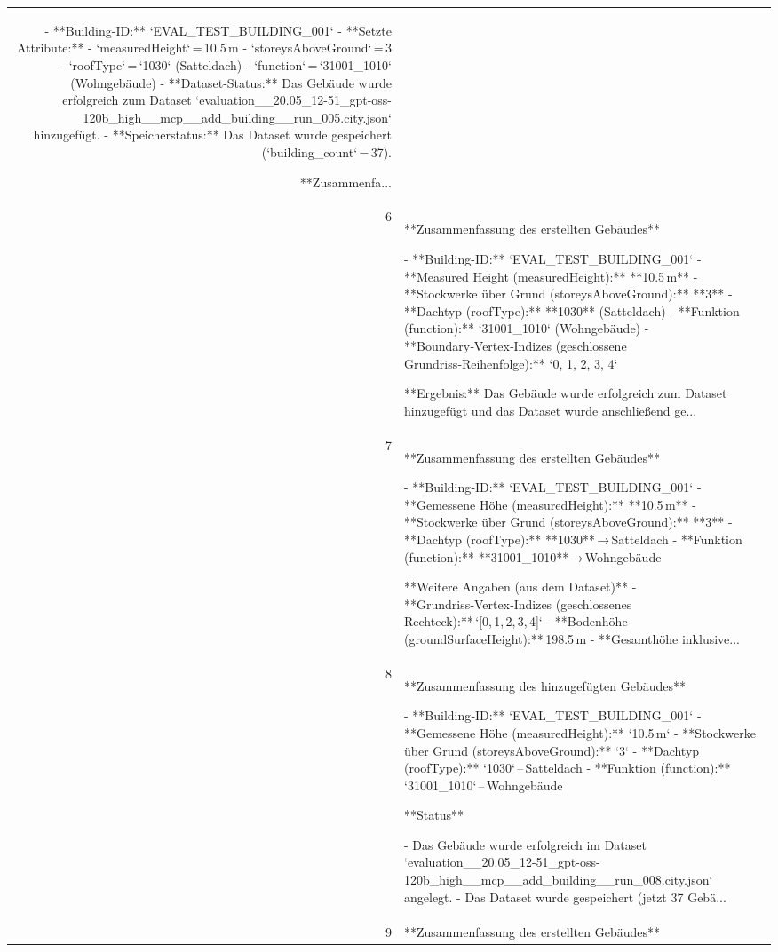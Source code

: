 \documentclass[a4paper,11pt]{article}
\begin{document}
\begin{table}[ht]
\begin{tabular}{r p{12cm}}
- **Building-ID:** `EVAL\_TEST\_BUILDING\_001`  
- **Setzte Attribute:**  
  - `measuredHeight` = 10.5 m  
  - `storeysAboveGround` = 3  
  - `roofType` = `1030` (Satteldach)  
  - `function` = `31001\_1010` (Wohngebäude)  
- **Dataset‑Status:** Das Gebäude wurde erfolgreich zum Dataset `evaluation\_\_20.05\_12-51\_gpt-oss-120b\_high\_\_mcp\_\_add\_building\_\_run\_005.city.json` hinzugefügt.  
- **Speicherstatus:** Das Dataset wurde gespeichert (`building\_count` = 37).  

**Zusammenfa... \\
6 & **Zusammenfassung des erstellten Gebäudes**

- **Building-ID:** `EVAL\_TEST\_BUILDING\_001`  
- **Measured Height (measuredHeight):** **10.5 m**  
- **Stockwerke über Grund (storeysAboveGround):** **3**  
- **Dachtyp (roofType):** **1030** (Satteldach)  
- **Funktion (function):** `31001\_1010` (Wohngebäude)  
- **Boundary‑Vertex‑Indizes (geschlossene Grundriss‑Reihenfolge):** `0, 1, 2, 3, 4`  

**Ergebnis:** Das Gebäude wurde erfolgreich zum Dataset hinzugefügt und das Dataset wurde anschließend ge... \\
7 & **Zusammenfassung des erstellten Gebäudes**

- **Building‑ID:** `EVAL\_TEST\_BUILDING\_001`  
- **Gemessene Höhe (measuredHeight):** **10.5 m**  
- **Stockwerke über Grund (storeysAboveGround):** **3**  
- **Dachtyp (roofType):** **1030** → Satteldach  
- **Funktion (function):** **31001\_1010** → Wohngebäude  

**Weitere Angaben (aus dem Dataset)**  
- **Grundriss‑Vertex‑Indizes (geschlossenes Rechteck):** `[0, 1, 2, 3, 4]`  
- **Bodenhöhe (groundSurfaceHeight):** 198.5 m  
- **Gesamthöhe inklusive... \\
8 & **Zusammenfassung des hinzugefügten Gebäudes**

- **Building‑ID:** `EVAL\_TEST\_BUILDING\_001`  
- **Gemessene Höhe (measuredHeight):** `10.5 m`  
- **Stockwerke über Grund (storeysAboveGround):** `3`  
- **Dachtyp (roofType):** `1030` – Satteldach  
- **Funktion (function):** `31001\_1010` – Wohngebäude  

**Status**

- Das Gebäude wurde erfolgreich im Dataset `evaluation\_\_20.05\_12-51\_gpt-oss-120b\_high\_\_mcp\_\_add\_building\_\_run\_008.city.json` angelegt.  
- Das Dataset wurde gespeichert (jetzt 37 Gebä... \\
9 & **Zusammenfassung des erstellten Gebäudes**


\end{tabular}
\end{table}
\end{document}
